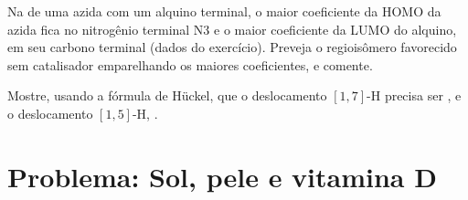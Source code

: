 \begin{exercise}[$\star\star\star$]\label{exo:b3:pericyclic:11}
Na  de uma azida com um alquino terminal, o maior
coeficiente da HOMO da azida fica no nitrogênio terminal N3 e o maior
coeficiente da LUMO do alquino, em seu carbono terminal (dados do exercício).
Preveja o regioisômero favorecido sem catalisador emparelhando os maiores
coeficientes, e comente.
\end{exercise}

\begin{exercise}[$\star\star\star$]\label{exo:b3:pericyclic:12}
Mostre, usando a fórmula de Hückel, que o deslocamento $[1,7]$-H precisa ser ,
e o deslocamento $[1,5]$-H, .
\end{exercise}

\clearpage
\enlargethispage{3\baselineskip}
\section{Problema: Sol, pele e vitamina D}

